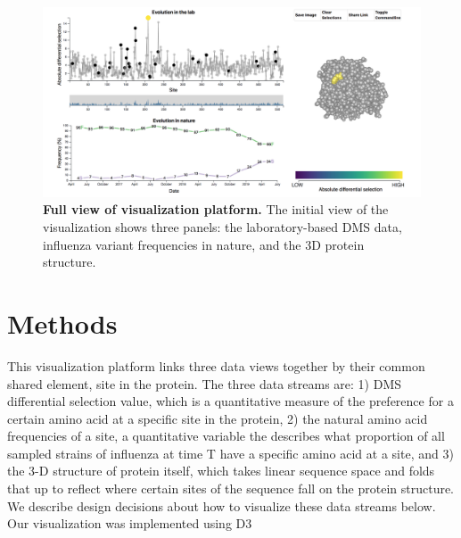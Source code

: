 \documentclass[sigchi, nonacm]{acmart}
\begin{document}
\begin{figure}[h]
	\includegraphics[width=\columnwidth]{viz-overview.png}
	\caption{\textbf{Full view of visualization platform.}
   The initial view of the visualization shows three panels: the laboratory-based DMS data, influenza variant frequencies in nature, and the 3D protein structure.
	}
	\label{overview}
\end{figure}

\section{Methods}

This visualization platform links three data views together by their common shared element, site in the protein.
The three data streams are: 1) DMS differential selection value, which is a quantitative measure of the preference for a certain amino acid at a specific site in the protein, 2) the natural amino acid frequencies of a site, a quantitative variable the describes what proportion of all sampled strains of influenza at time T have a specific amino acid at a site, and 3) the 3-D structure of protein itself, which takes linear sequence space and folds that up to reflect where certain sites of the sequence fall on the protein structure.
We describe design decisions about how to visualize these data streams below.
Our visualization was implemented using D3 \cite{bostock2011d3}
\end{document}
